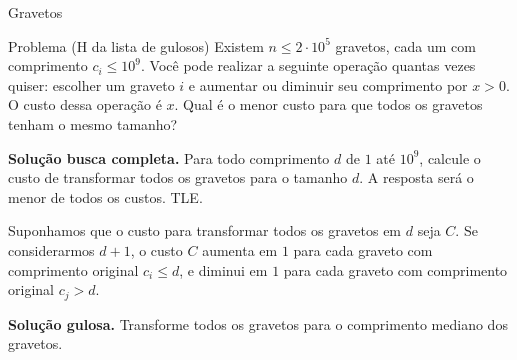 \begin{frame}{Gravetos}

    \begin{block}{Problema (H da lista de gulosos)}
        Existem $n \leq 2\cdot10^5$ gravetos, cada um com comprimento $c_i \leq 10^9$. Você pode realizar a seguinte operação quantas vezes quiser: escolher um graveto $i$ e aumentar ou diminuir seu comprimento por $x > 0$. O custo dessa operação é $x$. Qual é o menor custo para que todos os gravetos tenham o mesmo tamanho?
    \end{block} \pause

    {\bf Solução busca completa.} Para todo comprimento $d$ de $1$ até $10^9$, calcule o custo de transformar todos os gravetos para o tamanho $d$. A resposta será o menor de todos os custos. \pause TLE. \pause

    Suponhamos que o custo para transformar todos os gravetos em $d$ seja $C$. Se considerarmos $d+1$, o custo $C$ aumenta em $1$ para cada graveto com comprimento original $c_i \leq d$, e diminui em $1$ para cada graveto com comprimento original $c_j > d$. \pause

    {\bf Solução gulosa.} Transforme todos os gravetos para o comprimento mediano dos gravetos. \pause

    

\end{frame}


